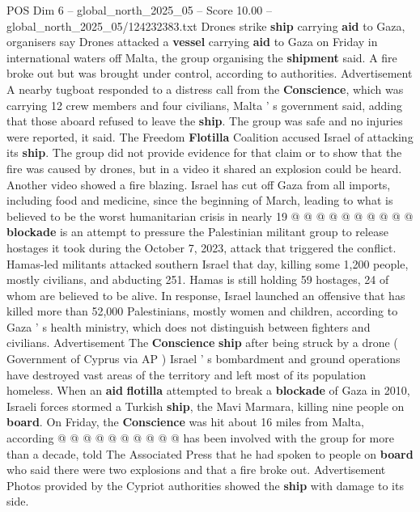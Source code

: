 \begin{textsample}{POS Dim 6 – global\_north\_2025\_05 – Score 10.00 – global\_north\_2025\_05/124232383.txt}  \label{ex:f6_pos_067}
Drones strike \textbf{ship} carrying \textbf{aid} to Gaza, organisers say Drones attacked a \textbf{vessel} carrying \textbf{aid} to Gaza on Friday in international waters off Malta, the group organising the \textbf{shipment} said.
A fire broke out but was brought under control, according to authorities.
Advertisement A nearby tugboat responded to a distress call from the \textbf{Conscience}, which was carrying 12 crew members and four civilians, Malta ' s government said, adding that those aboard refused to leave the \textbf{ship}.
The group was safe and no injuries were reported, it said.
The Freedom \textbf{Flotilla} Coalition accused Israel of attacking its \textbf{ship}.
The group did not provide evidence for that claim or to show that the fire was caused by drones, but in a video it shared an explosion could be heard.
Another video showed a fire blazing.
Israel has cut off Gaza from all imports, including food and medicine, since the beginning of March, leading to what is believed to be the worst humanitarian crisis in nearly 19 @ @ @ @ @ @ @ @ @ @ \textbf{blockade} is an attempt to pressure the Palestinian militant group to release hostages it took during the October 7, 2023, attack that triggered the conflict.
Hamas-led militants attacked southern Israel that day, killing some 1,200 people, mostly civilians, and abducting 251.
Hamas is still holding 59 hostages, 24 of whom are believed to be alive.
In response, Israel launched an offensive that has killed more than 52,000 Palestinians, mostly women and children, according to Gaza ' s health ministry, which does not distinguish between fighters and civilians.
Advertisement The \textbf{Conscience} \textbf{ship} after being struck by a drone ( Government of Cyprus via AP ) Israel ' s bombardment and ground operations have destroyed vast areas of the territory and left most of its population homeless.
When an \textbf{aid} \textbf{flotilla} attempted to break a \textbf{blockade} of Gaza in 2010, Israeli forces stormed a Turkish \textbf{ship}, the Mavi Marmara, killing nine people on \textbf{board}.
On Friday, the \textbf{Conscience} was hit about 16 miles from Malta, according @ @ @ @ @ @ @ @ @ @ has been involved with the group for more than a decade, told The Associated Press that he had spoken to people on \textbf{board} who said there were two explosions and that a fire broke out.
Advertisement Photos provided by the Cypriot authorities showed the \textbf{ship} with damage to its side.

\end{textsample}
